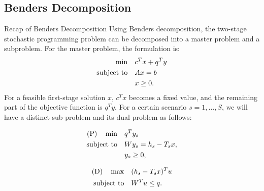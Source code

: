 \documentclass[aspectratio=169]{beamer}
\begin{document}
\subsection{Benders Decomposition}
\begin{frame}{Recap of Benders Decomposition}
Using Benders decomposition, the two-stage stochastic programming problem can be decomposed into a master problem and a subproblem. For the master problem, the formulation is:
\begin{align*}
          \min \quad & c^T x + q^T y \\
    \operatorname{subject~to} \quad & Ax = b \\
                     &  x \geq 0.
\end{align*}
For a feasible first-stage solution $x$, $c^T x$ becomes a fixed value, and the remaining part of the objective function is $q^T y$. For a certain scenario $s = 1, \dots, S$, we will have a distinct sub-problem and its dual problem as follows:
\vspace{-1.5em}
\begin{multicols}{2}
    \begin{align*}
        \text{(P)} \quad  \min \quad & q^T y_s \\
                    \operatorname{subject~to} \quad & Wy_s = h_s - T_s x, \\
                                     &  y_s \geq 0,
    \end{align*}
    \columnbreak
    
    \begin{align*}
        \text{(D)} \quad \max \quad & (h_s - T_s x)^T u \\
                   \operatorname{subject~to} \quad & W^T u \leq q.
    \end{align*}
\end{multicols}
\end{frame}
\end{document}
